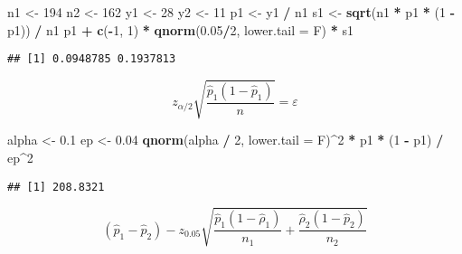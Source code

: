 \documentclass[
]{book}
\newenvironment{Shaded}{\begin{snugshade}}{\end{snugshade}}
\newcommand{\DataTypeTok}[1]{\textcolor[rgb]{0.13,0.29,0.53}{#1}}
\newcommand{\DecValTok}[1]{\textcolor[rgb]{0.00,0.00,0.81}{#1}}
\newcommand{\FloatTok}[1]{\textcolor[rgb]{0.00,0.00,0.81}{#1}}
\newcommand{\KeywordTok}[1]{\textcolor[rgb]{0.13,0.29,0.53}{\textbf{#1}}}
\newcommand{\NormalTok}[1]{#1}
\newcommand{\OperatorTok}[1]{\textcolor[rgb]{0.81,0.36,0.00}{\textbf{#1}}}
\newcommand{\StringTok}[1]{\textcolor[rgb]{0.31,0.60,0.02}{#1}}
\theoremstyle{definition}
\theoremstyle{definition}
\theoremstyle{definition}
\theoremstyle{remark}
\begin{document}
\begin{Shaded}
\begin{Highlighting}[]
\NormalTok{n1 <{-}}\StringTok{ }\DecValTok{194}
\NormalTok{n2 <{-}}\StringTok{ }\DecValTok{162}
\NormalTok{y1 <{-}}\StringTok{ }\DecValTok{28} 
\NormalTok{y2 <{-}}\StringTok{ }\DecValTok{11}
\NormalTok{p1 <{-}}\StringTok{ }\NormalTok{y1 }\OperatorTok{/}\StringTok{ }\NormalTok{n1}
\NormalTok{s1 <{-}}\StringTok{ }\KeywordTok{sqrt}\NormalTok{(n1 }\OperatorTok{*}\StringTok{ }\NormalTok{p1 }\OperatorTok{*}\StringTok{ }\NormalTok{(}\DecValTok{1} \OperatorTok{{-}}\StringTok{ }\NormalTok{p1)) }\OperatorTok{/}\StringTok{ }\NormalTok{n1}
\NormalTok{p1 }\OperatorTok{+}\StringTok{ }\KeywordTok{c}\NormalTok{(}\OperatorTok{{-}}\DecValTok{1}\NormalTok{, }\DecValTok{1}\NormalTok{) }\OperatorTok{*}\StringTok{ }\KeywordTok{qnorm}\NormalTok{(}\FloatTok{0.05}\OperatorTok{/}\DecValTok{2}\NormalTok{, }\DataTypeTok{lower.tail =}\NormalTok{ F) }\OperatorTok{*}\StringTok{ }\NormalTok{s1}
\end{Highlighting}
\end{Shaded}

\begin{verbatim}
## [1] 0.0948785 0.1937813
\end{verbatim}

\[
z_{\alpha / 2} \sqrt{\frac{\hat{p}_{1}\left(1-\hat{p}_{1}\right)}{n}} = \varepsilon
\]

\begin{Shaded}
\begin{Highlighting}[]
\NormalTok{alpha <{-}}\StringTok{ }\FloatTok{0.1}
\NormalTok{ep <{-}}\StringTok{ }\FloatTok{0.04}
\KeywordTok{qnorm}\NormalTok{(alpha }\OperatorTok{/}\StringTok{ }\DecValTok{2}\NormalTok{, }\DataTypeTok{lower.tail =}\NormalTok{ F)}\OperatorTok{\^{}}\DecValTok{2} \OperatorTok{*}\StringTok{ }\NormalTok{p1 }\OperatorTok{*}\StringTok{ }\NormalTok{(}\DecValTok{1} \OperatorTok{{-}}\StringTok{ }\NormalTok{p1) }\OperatorTok{/}\StringTok{ }\NormalTok{ep}\OperatorTok{\^{}}\DecValTok{2}
\end{Highlighting}
\end{Shaded}

\begin{verbatim}
## [1] 208.8321
\end{verbatim}

\[
\left(\hat{p}_{1}-\hat{p}_{2}\right)-z_{0.05} \sqrt{\frac{\hat{p}_{1}\left(1-\hat{\rho}_{1}\right)}{n_{1}}+\frac{\hat{\rho}_{2}\left(1-\hat{p}_{2}\right)}{n_{2}}}
\]
\end{document}
